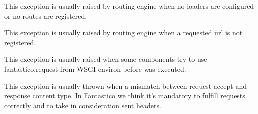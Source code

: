 \documentclass[letterpaper,10pt,english]{sphinxmanual}
\begin{document}

\begin{fulllineitems}
\label{features/exceptions:fantastico.exceptions.FantasticoNoRoutesError}
This exception is usually raised by routing engine when no loaders are configured or no routes are registered.

\end{fulllineitems}


\begin{fulllineitems}
\label{features/exceptions:fantastico.exceptions.FantasticoRouteNotFoundError}
This exception is usually raised by routing engine when a requested url is not registered.

\end{fulllineitems}


\begin{fulllineitems}
\label{features/exceptions:fantastico.exceptions.FantasticoNoRequestError}
This exception is usually raised when some components try to use fantastico.request from WSGI environ before
{\hyperref[features/request_response:fantastico.middleware.request_middleware.RequestMiddleware]{}} was executed.

\end{fulllineitems}


\begin{fulllineitems}
\label{features/exceptions:fantastico.exceptions.FantasticoContentTypeError}
This exception is usually thrown when a mismatch between request accept and response content type. In
Fantastico we think it's mandatory to fulfill requests correctly and to take in consideration sent headers.

\end{fulllineitems}
\end{document}
